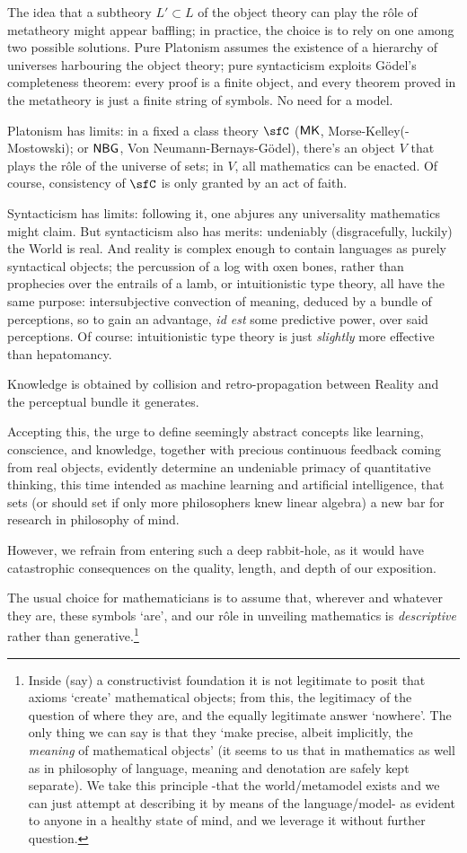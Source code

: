 The idea that a subtheory $L'\subset L$ of the object theory can play the r\^ole of metatheory might appear baffling; in practice, the choice is to rely on one among two possible solutions. Pure Platonism assumes the existence of a hierarchy of universes harbouring the object theory; pure syntacticism exploits G\"odel's completeness theorem: every proof is a finite object, and every theorem proved in the metatheory is just a finite string of symbols. No need for a model.

Platonism has limits: in a fixed a class theory $\sfC$ ($\sf MK$, Morse-Kelley(-Mostowski); or $\sf NBG$, Von Neumann-Bernays-G\"odel), there's an object $V$ that plays the r\^ole of the universe of sets; in $V$, all mathematics can be enacted. Of course, consistency of $\sfC$ is only granted by an act of faith.

Syntacticism has limits: following it, one abjures any universality mathematics might claim. But syntacticism also has merits: undeniably (disgracefully, luckily) the World is real. And reality is complex enough to contain languages as purely syntactical objects; the percussion of a log with oxen bones, rather than prophecies over the entrails of a lamb, or intuitionistic type theory, all have the same purpose: intersubjective convection of meaning, deduced by a bundle of perceptions, so to gain an advantage, \emph{id est} some predictive power, over said perceptions. Of course: intuitionistic type theory is just \emph{slightly} more effective than hepatomancy.

Knowledge is obtained by collision and retro-propagation between Reality and the perceptual bundle it generates.

Accepting this, the urge to define seemingly abstract concepts like learning, conscience, and knowledge, together with precious continuous feedback coming from real objects, evidently determine an undeniable primacy of quantitative thinking, this time intended as machine learning and artificial intelligence, that sets (or should set if only more philosophers knew linear algebra) a new bar for research in philosophy of mind.

However, we refrain from entering such a deep rabbit-hole, as it would have catastrophic consequences on the quality, length, and depth of our exposition.

The usual choice for mathematicians is to assume that, wherever and whatever they are, these symbols `are', and our r\^ole in unveiling mathematics is \emph{descriptive} rather than generative.\footnote{Inside (say) a constructivist foundation it is not legitimate to posit that axioms `create' mathematical objects; from this, the legitimacy of the question of where they are, and the equally legitimate answer `nowhere'. The only thing we can say is that they `make precise, albeit implicitly, the \emph{meaning} of mathematical objects' \cite{Agzz} (it seems to us that in mathematics as well as in philosophy of language, meaning and denotation are safely kept separate). We take this principle -that the world/metamodel exists and we can just attempt at describing it by means of the language/model- as evident to anyone in a healthy state of mind, and we leverage it without further question.}

